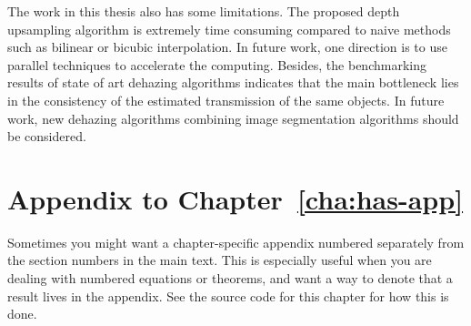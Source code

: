 The work in this thesis also has some limitations. The proposed depth upsampling algorithm is extremely time consuming compared to naive methods such as bilinear or bicubic interpolation. In future work, one direction is to use parallel techniques to accelerate the computing. Besides, the benchmarking results of state of art dehazing algorithms indicates that the main bottleneck lies in the consistency of the estimated transmission of the same objects. In future work, new dehazing algorithms combining image segmentation algorithms should be considered. 



\setcounter{section}{0}
\let\oldthesection\thesection
\renewcommand{\thesection}{\thechapter.\Alph{section}}
\section{Appendix to Chapter~\ref{cha:has-app}}

Sometimes you might want a chapter-specific appendix numbered separately from
the section numbers in the main text.
This is especially useful when you are dealing with numbered equations or
theorems, and want a way to denote that a result lives in the appendix.
See the source code for this chapter for how this is done.

\let\thesection\oldthesection

